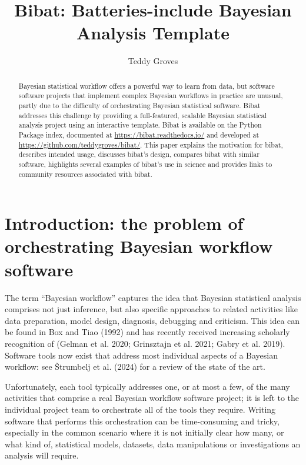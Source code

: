 \documentclass[
  letterpaper,
  DIV=11,
  numbers=noendperiod]{scrartcl}
\title{Bibat: Batteries-include Bayesian Analysis Template}
\author{Teddy Groves}
\date{}
\begin{document}
\maketitle
\begin{abstract}
Bayesian statistical workflow offers a powerful way to learn from data,
but software software projects that implement complex Bayesian workflows
in practice are unusual, partly due to the difficulty of orchestrating
Bayesian statistical software. Bibat addresses this challenge by
providing a full-featured, scalable Bayesian statistical analysis
project using an interactive template. Bibat is available on the Python
Package index, documented at \url{https://bibat.readthedocs.io/} and
developed at \url{https://github.com/teddygroves/bibat/}. This paper
explains the motivation for bibat, describes intended usage, discusses
bibat's design, compares bibat with similar software, highlights several
examples of bibat's use in science and provides links to community
resources associated with bibat.
\end{abstract}

\section{Introduction: the problem of orchestrating Bayesian workflow
software}\label{introduction-the-problem-of-orchestrating-bayesian-workflow-software}

The term ``Bayesian workflow'' captures the idea that Bayesian
statistical analysis comprises not just inference, but also specific
approaches to related activities like data preparation, model design,
diagnosis, debugging and criticism. This idea can be found in Box and
Tiao (1992) and has recently received increasing scholarly recognition
of (Gelman et al. 2020; Grinsztajn et al. 2021; Gabry et al. 2019).
Software tools now exist that address most individual aspects of a
Bayesian workflow: see Štrumbelj et al. (2024) for a review of the state
of the art.

Unfortunately, each tool typically addresses one, or at most a few, of
the many activities that comprise a real Bayesian workflow software
project; it is left to the individual project team to orchestrate all of
the tools they require. Writing software that performs this
orchestration can be time-consuming and tricky, especially in the common
scenario where it is not initially clear how many, or what kind of,
statistical models, datasets, data manipulations or investigations an
analysis will require.
\end{document}
